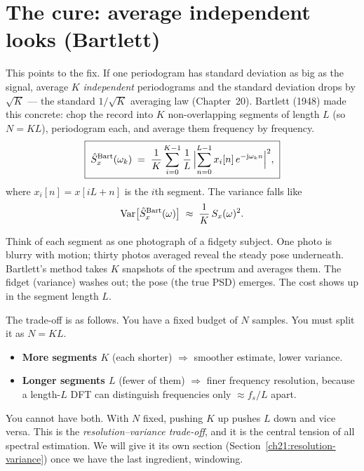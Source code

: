 \section{The cure: average independent looks (Bartlett)}
\label{ch21:bartlett}

This points to the fix. If one periodogram has standard
deviation as big as the signal, average $K$ \emph{independent} periodograms and the
standard deviation drops by $\sqrt{K}$ --- the standard $1/\sqrt{K}$ averaging law
(Chapter~20). Bartlett (1948) made this concrete: chop the record into
$K$ non-overlapping segments of length $L$ (so $N = KL$), periodogram each, and
average them frequency by frequency.
\[
\boxed{\;\hat{S}^{\text{Bart}}_x(\omega_k)
\;=\; \frac{1}{K}\sum_{i=0}^{K-1} \frac{1}{L}\,\abs[\Big]{\sum_{n=0}^{L-1} x_i[n]\,e^{-\jj\omega_k n}}^2,\;}
\]
where $x_i[n]=x[iL+n]$ is the $i$th segment. The variance falls like
\[
\Var\!\big[\hat{S}^{\text{Bart}}_x(\omega)\big] \;\approx\; \frac{1}{K}\,S_x(\omega)^2 .
\]

\begin{intuitionbox}
Think of each segment as one photograph of a fidgety subject. One photo is blurry
with motion; thirty photos averaged reveal the steady pose underneath. Bartlett's
method takes $K$ snapshots of the spectrum and averages them. The fidget (variance)
washes out; the pose (the true PSD) emerges. The cost shows up in the segment
length $L$.
\end{intuitionbox}

The trade-off is as follows. You have a fixed budget of $N$
samples. You must split it as $N=KL$.

\begin{itemize}
\item \textbf{More segments $K$} (each shorter) $\Rightarrow$ smoother estimate,
lower variance.
\item \textbf{Longer segments $L$} (fewer of them) $\Rightarrow$ finer frequency
resolution, because a length-$L$ DFT can distinguish frequencies only $\approx
f_s/L$ apart.
\end{itemize}

You cannot have both. With $N$ fixed, pushing $K$ up pushes $L$ down and vice
versa. This is the \emph{resolution--variance trade-off}, and it is the central
tension of all spectral estimation. We will give it its own section (Section~\ref{ch21:resolution-variance}) once we have the last ingredient,
windowing.

